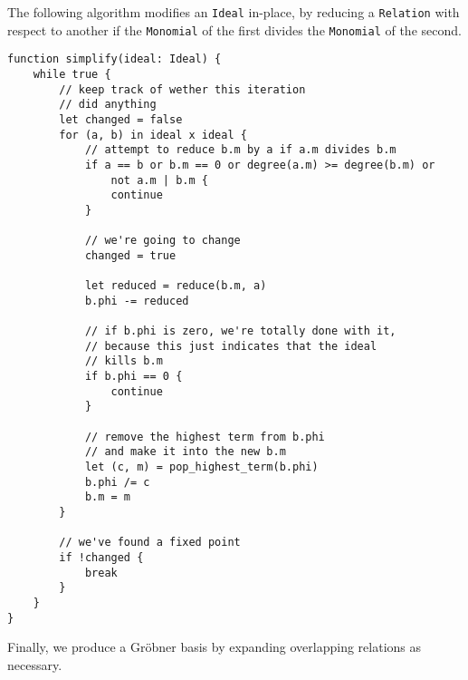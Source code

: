 \begin{alg}
    The following algorithm modifies an \verb|Ideal| in-place, by reducing a \verb|Relation|
    with respect to another if the \verb|Monomial| of the first divides the \verb|Monomial|
    of the second.
\begin{verbatim}
function simplify(ideal: Ideal) {
    while true {
        // keep track of wether this iteration 
        // did anything
        let changed = false
        for (a, b) in ideal x ideal {
            // attempt to reduce b.m by a if a.m divides b.m
            if a == b or b.m == 0 or degree(a.m) >= degree(b.m) or 
                not a.m | b.m {
                continue
            }
            
            // we're going to change
            changed = true
            
            let reduced = reduce(b.m, a)
            b.phi -= reduced
            
            // if b.phi is zero, we're totally done with it,
            // because this just indicates that the ideal
            // kills b.m
            if b.phi == 0 {
                continue
            }
            
            // remove the highest term from b.phi
            // and make it into the new b.m
            let (c, m) = pop_highest_term(b.phi)
            b.phi /= c
            b.m = m
        }
        
        // we've found a fixed point
        if !changed {
            break
        }
    }
}
\end{verbatim}
\end{alg}

Finally, we produce a Gr\"obner basis by expanding overlapping relations as
necessary.

